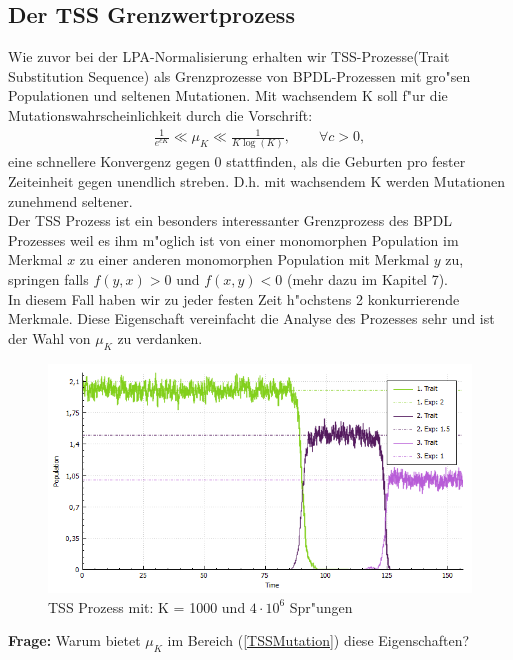 \documentclass[11pt, a4paper, german]{article}
\theoremstyle{plain}
\begin{document}
	\subsection{Der TSS Grenzwertprozess}
	Wie zuvor bei der LPA-Normalisierung erhalten wir TSS-Prozesse(Trait Substitution Sequence) als Grenzprozesse von BPDL-Prozessen mit gro"sen Populationen und seltenen Mutationen. Mit wachsendem K  soll f"ur die Mutationswahrscheinlichkeit durch die Vorschrift:
	\begin{align}
		\frac{1}{e^{cK}} \ll \mu_K \ll \frac{1}{K \log(K)}, \qquad \forall c > 0, \label{TSSMutation}
	\end{align}
	eine schnellere Konvergenz gegen 0 stattfinden, als die Geburten pro fester Zeiteinheit gegen unendlich streben. D.h. mit wachsendem K werden Mutationen zunehmend seltener.\\ 
	Der TSS Prozess ist ein besonders interessanter Grenzprozess des BPDL Prozesses weil es ihm m"oglich ist von einer monomorphen Population im Merkmal $ x $ zu einer anderen monomorphen Population mit Merkmal $ y $ zu, springen falls $ f(y,x) > 0 $ und $ f(x,y) < 0 $ (mehr dazu im Kapitel 7).\\
	In diesem Fall haben wir zu jeder festen Zeit h"ochstens 2 konkurrierende Merkmale. Diese Eigenschaft vereinfacht die Analyse des Prozesses sehr und ist der Wahl von $ \mu_K $ zu verdanken.\\
	\begin{figure}[H]
		\centering
		\includegraphics[width=1 \linewidth]{../BachelorArbeit/Pictures/TSS2_pure_small}
		\caption[TSS Prozess wechselnder Dominanz]{TSS Prozess mit: K = 1000 und $ 4 \cdot 10^6 $ Spr"ungen}
		\label{TSS_mitBPDLSimulator}
	\end{figure}
	\textbf{Frage:} Warum bietet $ \mu_K $ im Bereich (\ref{TSSMutation}) diese Eigenschaften?\\
	
\end{document}
